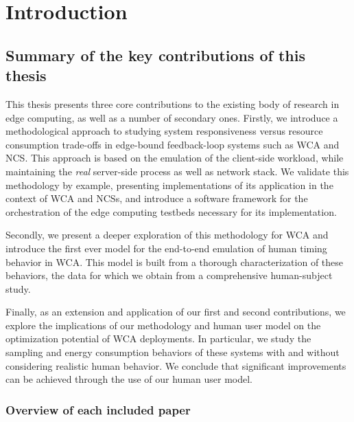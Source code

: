 \chapter{Introduction}\label{chap:introduction}



\section{Summary of the key contributions of this thesis}

This thesis presents three core contributions to the existing body of research in edge computing, as well as a number of secondary ones.
Firstly, we introduce a methodological approach to studying system responsiveness versus resource consumption trade-offs in edge-bound feedback-loop systems such as \ac{WCA} and \ac{NCS}.
This approach is based on the emulation of the client-side workload, while maintaining the \emph{real} server-side process as well as network stack.
We validate this methodology by example, presenting implementations of its application in the context of \ac{WCA} and \acp{NCS}, and introduce a software framework for the orchestration of the edge computing testbeds necessary for its implementation. 

Secondly, we present a deeper exploration of this methodology for \ac{WCA} and introduce the first ever model for the end-to-end emulation of human timing behavior in \ac{WCA}.
This model is built from a thorough characterization of these behaviors, the data for which we obtain from a comprehensive human-subject study.

Finally, as an extension and application of our first and second contributions, we explore the implications of our methodology and human user model on the optimization potential of \ac{WCA} deployments.
In particular, we study the sampling and energy consumption behaviors of these systems with and without considering realistic human behavior.
We conclude that significant improvements can be achieved through the use of our human user model.

\subsection{Overview of each included paper}

